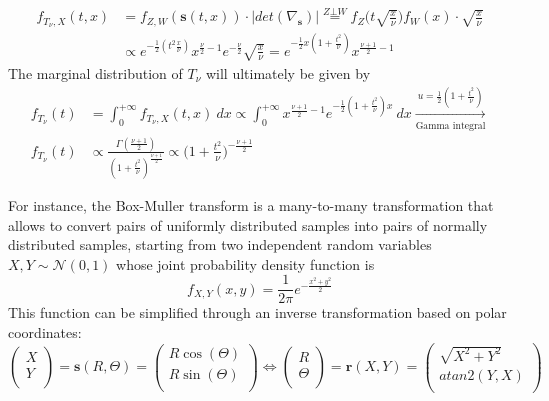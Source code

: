 \documentclass{report}
\begin{document}
\begin{examplebox}
    \begin{align*}
        f_{T_{\nu}, X}(t, x)
            &= f_{Z, W}(\mathbf{s}(t, x)) \cdot |det(\nabla_{\mathbf{s}})| \stackrel{Z \bot W}{=} f_Z\Bigg(t\sqrt{\frac{x}{\nu}}\Bigg)f_W(x) \cdot \sqrt{\frac{x}{\nu}} \\
            &\propto e^{-\frac{1}{2}(t^2\frac{x}{\nu})}x^{\frac{\nu}{2} - 1}e^{-\frac{\nu}{2}}\sqrt{\frac{x}{\nu}} = e^{-\frac{1}{2}x(1 + \frac{t^2}{\nu})}x^{\frac{\nu + 1}{2} - 1}
    \end{align*}
    The marginal distribution of $\displaystyle T_{\nu}$ will ultimately be given by
    \begin{align*}
        f_{T_\nu}(t) &= \int_0^{+\infty} f_{T_{\nu}, X}(t, x) \ dx \propto \int_0^{+\infty} x^{\frac{\nu + 1}{2} - 1}e^{-\frac{1}{2}(1 + \frac{t^2}{\nu})x} \ dx \xrightarrow[\text{Gamma integral}]{u = \frac{1}{2}(1 + \frac{t^2}{\nu})} \\
        f_{T_{\nu}}(t) &\propto \frac{\Gamma(\frac{\nu + 1}{2})}{(1 + \frac{t^2}{\nu})^{\frac{\nu + 1}{2}}} \propto \Bigg(1 + \frac{t^2}{\nu}\Bigg)^{-\frac{\nu + 1}{2}}
    \end{align*}
\end{examplebox}
\noindent For instance, the Box-Muller transform is a many-to-many transformation that allows to convert pairs of uniformly distributed samples into pairs of normally distributed samples, starting from two independent random variables $\displaystyle X, Y \sim \mathcal{N}(0, 1)$ whose joint probability density function is
\[f_{X, Y}(x, y) = \frac{1}{2\pi}e^{-\frac{x^2 + y^2}{2}}\]
This function can be simplified through an inverse transformation based on polar coordinates:
\[\begin{pmatrix}
    X \\
    Y \\
\end{pmatrix} = \mathbf{s}(R, \Theta) = \begin{pmatrix}
    R\cos(\Theta) \\
    R\sin(\Theta) \\
\end{pmatrix} \Leftrightarrow \begin{pmatrix}
    R \\
    \Theta \\
\end{pmatrix} = \mathbf{r}(X, Y) = \begin{pmatrix}
    \sqrt{X^2 + Y^2} \\
    atan2(Y, X) \\
\end{pmatrix}\]
\end{document}
